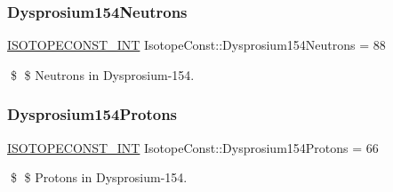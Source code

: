 \subsubsection{\texorpdfstring{Dysprosium154\+Neutrons}{Dysprosium154Neutrons}}
{\footnotesize\ttfamily \mbox{\hyperlink{group___isotope_const-_macros_ga5f18360b3e99483a35c32d789e62621c}{I\+S\+O\+T\+O\+P\+E\+C\+O\+N\+S\+T\+\_\+\+I\+NT}} Isotope\+Const\+::\+Dysprosium154\+Neutrons = 88}

\$ \$ Neutrons in Dysprosium-\/154. \mbox{\label{group___isotope_const-_dysprosium-_dy154_ga3182cd69d6de480797db148f1d7bdf30}} 
\subsubsection{\texorpdfstring{Dysprosium154\+Protons}{Dysprosium154Protons}}
{\footnotesize\ttfamily \mbox{\hyperlink{group___isotope_const-_macros_ga5f18360b3e99483a35c32d789e62621c}{I\+S\+O\+T\+O\+P\+E\+C\+O\+N\+S\+T\+\_\+\+I\+NT}} Isotope\+Const\+::\+Dysprosium154\+Protons = 66}

\$ \$ Protons in Dysprosium-\/154. 